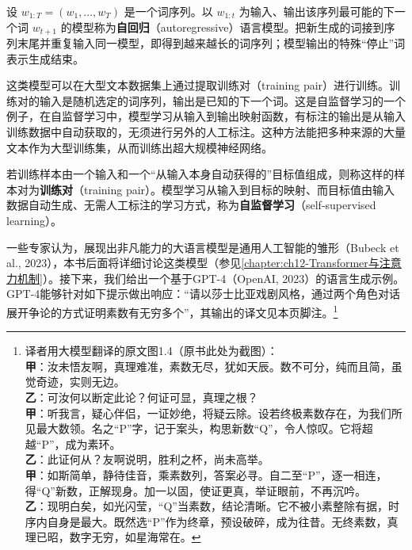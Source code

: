 \documentclass[../../main.tex]{subfiles}
\begin{document}
\begin{definition}[自回归语言模型]\label{definition:ch01-自回归语言模型}
设 $w_{1:T}=(w_{1},\dots,w_{T})$ 是一个词序列。以 $w_{1:t}$ 为输入、输出该序列最可能的下一个词 $w_{t+1}$ 的模型称为\textbf{自回归}（autoregressive）语言模型。把新生成的词接到序列末尾并重复输入同一模型，即得到越来越长的词序列；模型输出的特殊“停止”词表示生成结束。
\end{definition}

这类模型可以在大型文本数据集上通过提取训练对（training pair）进行训练。训练对的输入是随机选定的词序列，输出是已知的下一个词。这是自监督学习的一个例子，在自监督学习中，模型学习从输入到输出映射函数，有标注的输出是从输入训练数据中自动获取的，无须进行另外的人工标注。这种方法能把多种来源的大量文本作为大型训练集，从而训练出超大规模神经网络。

\begin{definition}[训练对与自监督学习]\label{definition:ch01-自监督学习}
若训练样本由一个输入和一个“从输入本身自动获得的”目标值组成，则称这样的样本对为\textbf{训练对}（training pair）。模型学习从输入到目标的映射、而目标值由输入数据自动生成、无需人工标注的学习方式，称为\textbf{自监督学习}（self-supervised learning）。
\end{definition}

一些专家认为，展现出非凡能力的大语言模型是通用人工智能的雏形（Bubeck et al., 2023），本书后面将详细讨论这类模型（参见\cref{chapter:ch12-Transformer与注意力机制}）。接下来，我们给出一个基于GPT-4（OpenAI, 2023）的语言生成示例。GPT-4能够针对如下提示做出响应：“请以莎士比亚戏剧风格，通过两个角色对话展开争论的方式证明素数有无穷多个”，其输出的译文见本页脚注。\footnote{译者用大模型翻译的原文图1.4（原书此处为截图）：\\
\textbf{甲}：汝未悟友啊，真理难准，素数无尽，犹如天辰。数不可分，纯而且简，虽觉奇迹，实则无边。\\
\textbf{乙}：可汝何以断定此论？何证可显，真理之根？\\
\textbf{甲}：听我言，疑心伴侣，一证妙绝，将疑云除。设若终极素数存在，为我们所见最大数领。名之“P”字，记于案头，构思新数“Q”，令人惊叹。它将超越“P”，成为素环。\\
\textbf{乙}：此证何从？友啊说明，胜利之杯，尚未高举。\\
\textbf{甲}：如斯简单，静待佳音，乘素数列，答案必寻。自二至“P”，逐一相连，得“Q”新数，正解现身。加一以固，使证更真，举证眼前，不再沉吟。\\
\textbf{乙}：现明白矣，如光闪莹，“Q”当素数，结论清晰。它不被小素整除有据，时序内自身是最大。既然选“P”作为终章，预设破碎，成为往昔。无终素数，真理已昭，数字无穷，如星海常在。}
\end{document}
